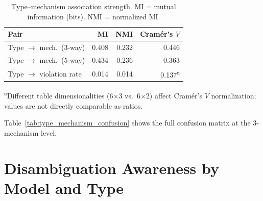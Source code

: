 \begin{table}[!ht]
\centering
\small
\caption{Type--mechanism association strength. MI = mutual information (bits). NMI = normalized MI.}
\label{tab:type_mechanism_mi}
\setlength{\tabcolsep}{4pt}
\begin{tabular}{lrrr}
\toprule
Pair & MI & NMI & Cramér's $V$ \\
\midrule
Type $\to$ mech.\ (3-way) & 0.408 & 0.232 & 0.446 \\
Type $\to$ mech.\ (5-way) & 0.434 & 0.236 & 0.363 \\
Type $\to$ violation rate & 0.014 & 0.014 & 0.137\textsuperscript{a} \\
\bottomrule
\end{tabular}

\vspace{2pt}
{\footnotesize \textsuperscript{a}Different table dimensionalities (6$\times$3 vs.\ 6$\times$2) affect Cram\'{e}r's $V$ normalization; values are not directly comparable as ratios.}
\end{table}

Table~\ref{tab:type_mechanism_confusion} shows the full confusion matrix at the 3-mechanism level.

\begin{table}[!ht]
\centering
\small
\caption{Type--mechanism confusion matrix (3-mechanism + other). Cell values are trace counts across all five models ($N = 614$).}
\label{tab:type_mechanism_confusion}
\end{table}

\section{Disambiguation Awareness by Model and Type}
\label{app:awareness_breakdown}

